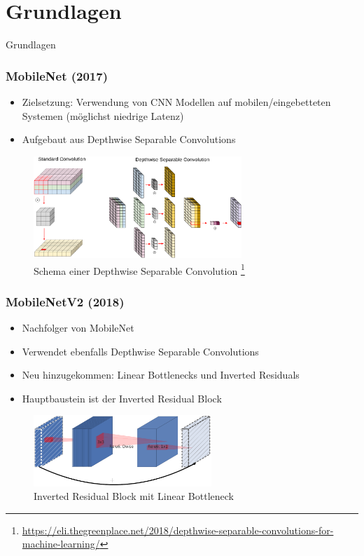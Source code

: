 \documentclass{beamer}
\begin{document}
\section{Grundlagen}
\begin{frame}
\huge
\centering
Grundlagen
\end{frame}


\begin{frame}
\frametitle{MobileNet (2017) \cite{howard_mobilenets_2017}}

\begin{itemize}
	\item Zielsetzung: Verwendung von CNN Modellen auf mobilen/eingebetteten Systemen (möglichst niedrige Latenz)
	\item Aufgebaut aus Depthwise Separable Convolutions
\end{itemize}

\begin{figure}
\includegraphics[width=0.7\textwidth]{img/depthwise_separable.png}
\caption{Schema einer Depthwise Separable Convolution \footnote{\url{https://eli.thegreenplace.net/2018/depthwise-separable-convolutions-for-machine-learning/}}}
\end{figure}

\end{frame}


\begin{frame}
\frametitle{MobileNetV2 (2018) \cite{sandler_mobilenetv2_2019}}

\begin{itemize}
	\item Nachfolger von MobileNet
	\item Verwendet ebenfalls Depthwise Separable Convolutions
	\item Neu hinzugekommen: Linear Bottlenecks und Inverted Residuals
	\item Hauptbaustein ist der Inverted Residual Block
\end{itemize}

\begin{figure}
\includegraphics[width=0.6\textwidth]{img/inverted_residual.png}
\caption{Inverted Residual Block mit Linear Bottleneck \cite{sandler_mobilenetv2_2019}}
\end{figure}

\end{frame}
\end{document}
